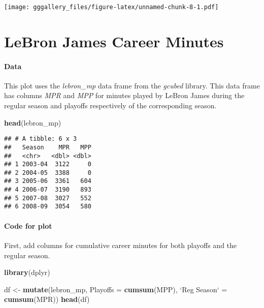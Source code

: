 \documentclass[]{book}
\newenvironment{Shaded}{\begin{snugshade}}{\end{snugshade}}
\newcommand{\DataTypeTok}[1]{\textcolor[rgb]{0.13,0.29,0.53}{#1}}
\newcommand{\KeywordTok}[1]{\textcolor[rgb]{0.13,0.29,0.53}{\textbf{#1}}}
\newcommand{\NormalTok}[1]{#1}
\newcommand{\StringTok}[1]{\textcolor[rgb]{0.31,0.60,0.02}{#1}}
\begin{document}
\texttt{[image: gggallery\_files/figure-latex/unnamed-chunk-8-1.pdf]}

\hypertarget{lebron}{%
\chapter*{LeBron James Career Minutes}\label{lebron}}

\hypertarget{lebrondata}{%
\subsubsection*{Data}\label{lebrondata}}

This plot uses the \emph{lebron\_mp} data frame from the \emph{gcubed} library. This data frame has columns \emph{MPR} and \emph{MPP} for minutes played by LeBron James during the regular season and playoffs respectively of the corresponding season.

\begin{Shaded}
\begin{Highlighting}[]
\KeywordTok{head}\NormalTok{(lebron_mp)}
\end{Highlighting}
\end{Shaded}

\begin{verbatim}
## # A tibble: 6 x 3
##   Season    MPR   MPP
##   <chr>   <dbl> <dbl>
## 1 2003-04  3122     0
## 2 2004-05  3388     0
## 3 2005-06  3361   604
## 4 2006-07  3190   893
## 5 2007-08  3027   552
## 6 2008-09  3054   580
\end{verbatim}

\hypertarget{lebroncode}{%
\subsubsection*{Code for plot}\label{lebroncode}}

First, add columns for cumulative career minutes for both playoffs and the regular season.

\begin{Shaded}
\begin{Highlighting}[]
\KeywordTok{library}\NormalTok{(dplyr)}

\NormalTok{df <-}\StringTok{ }\KeywordTok{mutate}\NormalTok{(lebron_mp, }\DataTypeTok{Playoffs =} \KeywordTok{cumsum}\NormalTok{(MPP),}
                    \StringTok{`}\DataTypeTok{Reg Season}\StringTok{`}\NormalTok{ =}\StringTok{ }\KeywordTok{cumsum}\NormalTok{(MPR))}
\KeywordTok{head}\NormalTok{(df)}
\end{Highlighting}
\end{Shaded}
\end{document}
